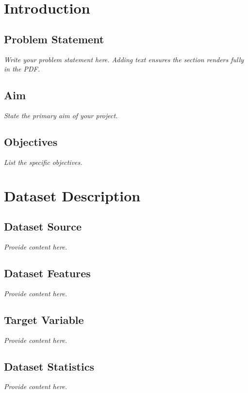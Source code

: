 \documentclass[12pt, a4paper]{article}
\begin{document}
    
    
   



\section{Introduction}
\subsection{Problem Statement}
\textit{Write your problem statement here. Adding text ensures the section renders fully in the PDF.}

\subsection{Aim}
\textit{State the primary aim of your project.}

\subsection{Objectives}
\textit{List the specific objectives.}

\section{Dataset Description}
\subsection{Dataset Source}
\textit{Provide content here.}

\subsection{Dataset Features}
\textit{Provide content here.}

\subsection{Target Variable}
\textit{Provide content here.}

\subsection{Dataset Statistics}
\textit{Provide content here.}
\end{document}
